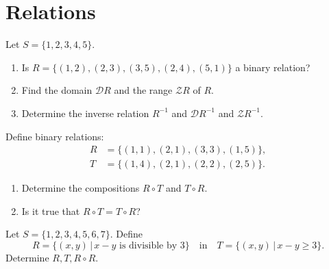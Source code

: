 \documentclass[11pt,paper=b5,footinclude,headinclude]{scrbook} %
\theoremstyle{remark}
\theoremstyle{definition} %
\theoremstyle{theorem} %
\newtheorem{ex}{Exercise\hypertarget{sol:\theex}}[chapter]
\begin{document}
\begin{ex}
\begin{sol}
\begin{enumerate}
\end{enumerate}


\end{sol}
\end{ex}

\chapter{Relations}

    
\begin{ex} 
Let $S=\{1,2,3,4,5\}$. 
\begin{enumerate}
    \item Is $R=\{(1,2),(2,3), (3,5), (2,4), (5,1)\}$ a binary relation?
    \item Find the domain $\mathcal{D} R$ and the range $\mathcal{Z} R$ of $R$.
    \item 
  Determine the inverse relation $R^{-1}$ and  $\mathcal{D} R^{-1}$ and  $\mathcal{Z} R^{-1}$.
\end{enumerate}

\end{ex}\begin{ex}
Define binary relations:
\begin{align*}
    R&=\{(1,1),(2,1), (3,3), (1,5)\},\\
    T&=\{(1,4),(2,1), (2,2), (2,5)\}.
\end{align*}
\begin{enumerate}
    \item 
Determine the compositions $R\circ T$ and $T\circ R$. 
\item Is it true that $R\circ T = T \circ R$?
\end{enumerate}

\end{ex}\begin{ex}
 Let  $S=\{1,2,3,4,5,6,7\}$. Define
$$R= \{(x,y)\,|\, x-y \textrm{ is divisible by  }  3\} \quad \mathrm{ in } \quad  T= \{(x,y)\,|\, x-y \geq 3\}.$$
Determine $R,T, R\circ R$.

\end{ex}
\end{document}
